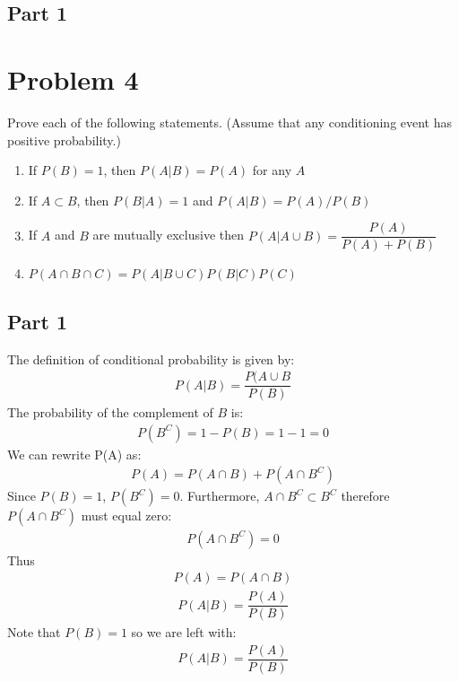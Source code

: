\documentclass{article}
\begin{document}
\subsection*{Part 1}
\clearpage
\section*{Problem 4}
Prove each of the following statements. (Assume that any conditioning event has positive probability.)
\begin{enumerate}
\item
If $P(B) = 1$, then $P(A|B) = P(A)$ for any $A$
\item
If $A \subset B$, then $P(B|A) = 1$ and $P(A|B)=P(A)/P(B)$
\item
If $A$ and $B$ are mutually exclusive then $P(A|A\cup B) = \dfrac{P(A)}{P(A)+P(B)}$
\item
$P(A\cap B \cap C) = P(A|B\cup C) P(B|C) P(C)$
\end{enumerate}
\subsection*{Part 1}
The definition of conditional probability is given by:
\begin{align*}
P(A|B) = \dfrac{P(A\cup B}{P(B)}
\end{align*}
The probability of the complement of $B$ is:
\begin{align*}
P(B^C) = 1-P(B) = 1-1 = 0
\end{align*}
We can rewrite P(A) as:
\begin{align*}
P(A) = P(A\cap B) + P(A\cap B^C)
\end{align*}
Since $P(B) = 1$, $P(B^C)=0$. Furthermore, $A\cap B^C\subset B^C$ therefore $P(A\cap B^C)$ must equal zero:
\begin{align*}
P(A\cap B^C) = 0
\end{align*}
Thus
\begin{align*}
P(A) = P(A\cap B)
\end{align*}
\begin{align*}
P(A|B) = \dfrac{P(A)}{P(B)}
\end{align*}
Note that $P(B)=1$ so we are left with:
\begin{align*}
\boxed{P(A|B) = \dfrac{P(A)}{P(B)}}
\end{align*}
\end{document}
